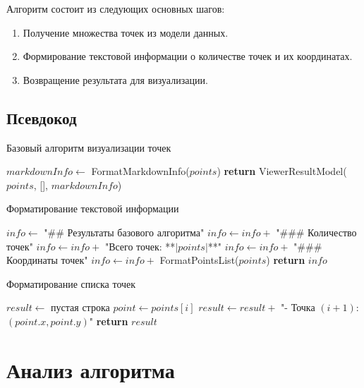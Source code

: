 \documentclass[a4paper,12pt]{article}
\begin{document}
Алгоритм состоит из следующих основных шагов:
\begin{enumerate}
    \item Получение множества точек из модели данных.
    \item Формирование текстовой информации о количестве точек и их координатах.
    \item Возвращение результата для визуализации.
\end{enumerate}

\subsection{Псевдокод}

\begin{algorithm}
\caption{Базовый алгоритм визуализации точек}
\begin{algorithmic}[1]
    \State $markdownInfo \gets$ FormatMarkdownInfo($points$)
    \State \textbf{return} ViewerResultModel($points$, [], $markdownInfo$)
\EndProcedure
\end{algorithmic}
\end{algorithm}

\begin{algorithm}
\caption{Форматирование текстовой информации}
\begin{algorithmic}[1]
    \State $info \gets$ "## Результаты базового алгоритма\n\n"
    \State $info \gets info +$ "### Количество точек\n"
    \State $info \gets info +$ "Всего точек: **$|points|$**\n\n"
    \State $info \gets info +$ "### Координаты точек\n"
    \State $info \gets info +$ FormatPointsList($points$)
    \State \textbf{return} $info$
\EndProcedure
\end{algorithmic}
\end{algorithm}

\begin{algorithm}
\caption{Форматирование списка точек}
\begin{algorithmic}[1]
    \State $result \gets$ пустая строка
        \State $point \gets points[i]$
        \State $result \gets result +$ "- Точка $(i + 1)$: $(point.x, point.y)$\n"
    \EndFor
    \State \textbf{return} $result$
\EndProcedure
\end{algorithmic}
\end{algorithm}

\section{Анализ алгоритма}
\end{document}
